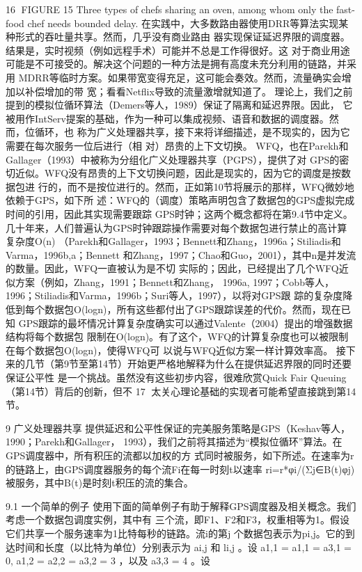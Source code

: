                                                  16
FIGURE 15 Three types of chefs sharing an oven, among whom only the fast-food chef needs
bounded delay.
在实践中，大多数路由器使用DRR等算法实现某种形式的吞吐量共享。然而，几乎没有商业路由
器实现保证延迟界限的调度器。结果是，实时视频（例如远程手术）可能并不总是工作得很好。这
对于商业用途可能是不可接受的。解决这个问题的一种方法是拥有高度未充分利用的链路，并采用
MDRR等临时方案。如果带宽变得充足，这可能会奏效。然而，流量确实会增加以补偿增加的带
宽；看看Netflix导致的流量激增就知道了。
理论上，我们之前提到的模拟位循环算法（Demers等人，1989）保证了隔离和延迟界限。因此，
它被用作IntServ提案的基础，作为一种可以集成视频、语音和数据的调度器。然而，位循环，也
称为广义处理器共享，接下来将详细描述，是不现实的，因为它需要在每次服务一位后进行（相
对）昂贵的上下文切换。
WFQ，也在Parekh和Gallager（1993）中被称为分组化广义处理器共享（PGPS），提供了对
GPS的密切近似。WFQ没有昂贵的上下文切换问题，因此是现实的，因为它的调度是按数据包进
行的，而不是按位进行的。然而，正如第10节将展示的那样，WFQ微妙地依赖于GPS，如下所
述：WFQ的（调度）策略声明包含了数据包的GPS虚拟完成时间的引用，因此其实现需要跟踪
GPS时钟；这两个概念都将在第9.4节中定义。
几十年来，人们普遍认为GPS时钟跟踪操作需要对每个数据包进行禁止的高计算复杂度O(n)
（Parekh和Gallager，1993；Bennett和Zhang，1996a；Stiliadis和Varma，1996b,a；Bennett
和Zhang，1997；Chao和Guo，2001），其中n是并发流的数量。因此，WFQ一直被认为是不切
实际的；因此，已经提出了几个WFQ近似方案（例如，Zhang，1991；Bennett和Zhang，
1996a, 1997；Cobb等人，1996；Stiliadis和Varma，1996b；Suri等人，1997），以将对GPS跟
踪的复杂度降低到每个数据包O(logn)，所有这些都付出了GPS跟踪误差的代价。然而，现在已知
GPS跟踪的最坏情况计算复杂度确实可以通过Valente（2004）提出的增强数据结构将每个数据包
限制在O(logn)。有了这个，WFQ的计算复杂度也可以被限制在每个数据包O(logn)，使得WFQ可
以说与WFQ近似方案一样计算效率高。
接下来的几节（第9节至第14节）开始更严格地解释为什么在提供延迟界限的同时还要保证公平性
是一个挑战。虽然没有这些初步内容，很难欣赏Quick Fair Queuing（第14节）背后的创新，但不
                                                                                           17
太关心理论基础的实现者可能希望直接跳到第14节。

9 广义处理器共享
提供延迟和公平性保证的完美服务策略是GPS（Keshav等人，1990；Parekh和Gallager，
1993），我们之前将其描述为“模拟位循环”算法。在GPS调度器中，所有积压的流都以加权的方
式同时被服务，如下所述。在速率为r的链路上，由GPS调度器服务的每个流Fi在每一时刻t以速率
ri=r*φi/(Σj∈B(t)φj)被服务，其中B(t)是时刻t积压的流的集合。

9.1 一个简单的例子
使用下面的简单例子有助于解释GPS调度器及相关概念。我们考虑一个数据包调度实例，其中有
三个流，即F1、F2和F3，权重相等为1。假设它们共享一个服务速率为1比特每秒的链路。流i的第j
个数据包表示为pi,j。它的到达时间和长度（以比特为单位）分别表示为 ai,j 和 li,j 。设
a1,1 = a1,1 = a3,1 = 0, a1,2 = a2,2 = a3,2 = 3 ，以及 a3,3 = 4 。设
                                                                                     ​    ​





